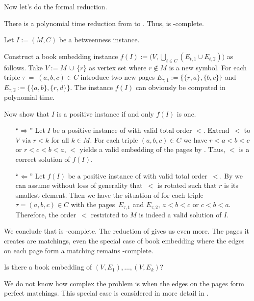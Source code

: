Now let's do the formal reduction.

\begin{theorem}
\label{lemma:np-hard}
There is a polynomial time reduction from \probBetween to \probBook. Thus,
\probBook is \NP-complete.
\end{theorem}
\begin{myproof}
Let $I := (M, C)$ be a betweenness instance. 

Construct a book embedding instance $f(I) := \bigl(V, \bigcup_{t \in C} \left(E_{t,1} \cup E_{t,2}\right)\bigr)$ as follows.
Take $V := M\,\cup\,\{r\}$ as vertex set where $r \not\in M$ is a new symbol. For each triple $\tau~=~(a, b, c) \in C$ introduce
two new pages $E_{\tau, 1} := \bigl\{\{r, a\}, \{b, c\}\bigr\}$ and $E_{\tau, 2} := \bigl\{\{a, b\},\{r, d\}\bigr\}$. The instance $f(I)$ can obviously 
be computed in polynomial time.

Now show that $I$ is a positive instance if and only $f(I)$ is one.\nopagebreak
\begin{itemize}
\item[``$\Rightarrow$''] Let $I$ be a positive instance of \probBetween with valid total order $<$. Extend~$<$ to $V$ via
$r < k$ for all $k \in M$. For each triple $(a, b, c) \in C$ we have $r < a < b < c$ or $r < c < b < a$, \ie $<$ yields
a valid embedding of the pages by . Thus, $<$ is a correct solution of $f(I)$.

\item[``$\Leftarrow$''] Let $f(I)$ be a positive instance of \probBook with valid total order~$<$. By  we
can assume  without loss
of generality that~$<$ is rotated such that $r$ is its smallest element. Then we have the situation of  for each triple $\tau = (a, b, c) \in C$ with
the pages~$E_{\tau,1}$ and $E_{\tau,2}$, \ie $a < b < c$ or $c < b < a$. Therefore, the order~$<$ restricted to $M$ is indeed a valid solution of $I$.\qedhere
\end{itemize}
\end{myproof}

We conclude that \probBook is \NP-complete. The reduction of
 gives us even more. The pages it creates are
matchings, \ie even the special case \probNotMatching of book embedding where the
edges on each page form a matching remains \NP-complete.

%
{Is there a book embedding of $(V, E_1), \dotsc, (V, E_k)$?}

We do not know how complex the problem is when the edges on the pages form perfect matchings. This
special case is considered in more detail in .
